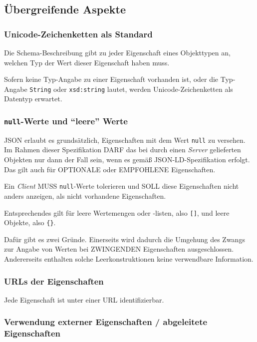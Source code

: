 \documentclass[,a4paper]{article}
\begin{document}
\subsection{Übergreifende Aspekte}\label{uxfcbergreifende-aspekte}

\subsubsection{Unicode-Zeichenketten als
Standard}\label{unicodeux5fzeichenketten}

Die Schema-Beschreibung gibt zu jeder Eigenschaft eines Objekttypen an,
welchen Typ der Wert dieser Eigenschaft haben muss.

Sofern keine Typ-Angabe zu einer Eigenschaft vorhanden ist, oder die
Typ-Angabe \texttt{String} oder \texttt{xsd:string} lautet, werden
Unicode-Zeichenketten als Datentyp erwartet.

\subsubsection{\texttt{null}-Werte und ``leere''
Werte}\label{null-werte-und-leere-werte}

JSON erlaubt es grundsätzlich, Eigenschaften mit dem Wert \texttt{null}
zu versehen. Im Rahmen dieser Spezifikation DARF das bei durch einen
\emph{Server} gelieferten Objekten nur dann der Fall sein, wenn es gemäß
JSON-LD-Spezifikation erfolgt. Das gilt auch für OPTIONALE oder
EMPFOHLENE Eigenschaften.

Ein \emph{Client} MUSS \texttt{null}-Werte tolerieren und SOLL diese
Eigenschaften nicht anders anzeigen, als nicht vorhandene Eigenschaften.

Entsprechendes gilt für leere Wertemengen oder -listen, also
\texttt{{[}{]}}, und leere Objekte, also \texttt{\{\}}.

Dafür gibt es zwei Gründe. Einerseits wird dadurch die Umgehung des
Zwangs zur Angabe von Werten bei ZWINGENDEN Eigenschaften
ausgeschlossen. Andererseits enthalten solche Leerkonstruktionen keine
verwendbare Information.

\subsubsection{URLs der Eigenschaften}\label{urls-der-eigenschaften}

Jede Eigenschaft ist unter einer URL identifizierbar.

\subsubsection{Verwendung externer Eigenschaften / abgeleitete
Eigenschaften}\label{verwendung-externer-eigenschaften-abgeleitete-eigenschaften}
\end{document}
